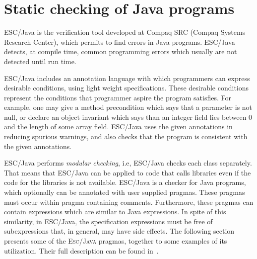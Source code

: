 \documentclass[a4paper]{llncs}
\begin{document}
\section{Static checking of Java programs}
\label{SectStatic}


\label{SubSectEscJava}
ESC/Java is the verification tool developed at
Compaq SRC (Compaq Systems Research Center), which permits to find
 errors in Java programs. ESC/Java detects, at
compile time, common programming errors which usually are not
detected until run time. 

ESC/Java includes an annotation language with which
programmers can express desirable conditions, using light weight
specifications. These desirable conditions represent the conditions
that programmer aspire the program satisfies. For example, one may
give a method precondition which
says that a parameter is not null, or declare an object invariant which
says than an integer field lies between $0$ and the length of some
array field. ESC/Java uses the given annotations in reducing
spurious warnings, and also checks that the program is consistent with 
the given annotations. 

ESC/Java performs \textit{modular checking}, i.e,
ESC/Java checks each class separately. That means that
ESC/Java can be applied to code that calls libraries even if
the code for the libraries is not available. ESC/Java is a
checker for Java programs, which optionally can be annotated
with user supplied pragmas. These pragmas must occur within pragma
containing comments. Furthermore, these pragmas can contain
expressions which are similar to Java expressions. In spite
of this similarity, in ESC/Java, the specification
expressions must be free of subexpressions that, in general, may have
side effects. The following section presents some of the
\textsc{Esc/Java} pragmas, together to some examples of its
utilization. Their full description can be found in~\cite{ESCManual}.
\end{document}
